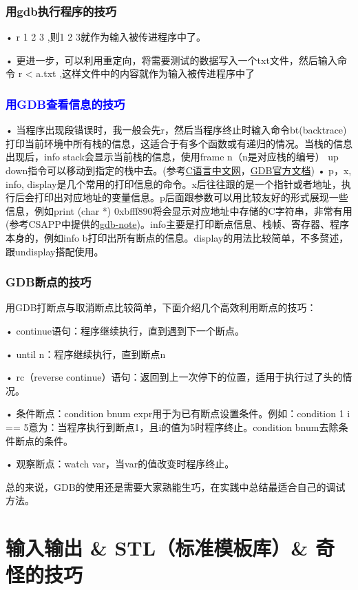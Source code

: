\documentclass[UTF8]{ctexart}
\begin{document}
\subsubsection{用gdb执行程序的技巧}
• r 1 2 3 ,则1 2 3就作为输入被传进程序中了。

• 更进一步，可以利用重定向，将需要测试的数据写入一个txt文件，然后输入命令 r < a.txt ,这样文件中的内容就作为输入被传进程序中了

\subsubsection{\textcolor{blue}{用GDB查看信息的技巧}}
• 当程序出现段错误时，我一般会先r，然后当程序终止时输入命令bt(backtrace)打印当前环境中所有栈的信息，这适合于有多个函数或有递归的情况。当栈的信息出现后，info stack会显示当前栈的信息，使用frame n（n是对应栈的编号） up down指令可以移动到指定的栈中去。(参考\href{https://c.biancheng.net/view/8282.html}{C语言中文网}，\href{https://sourceware.org/gdb/current/onlinedocs/gdb.html/Stack.html#Stack}{GDB官方文档})
• p，x, info, display是几个常用的打印信息的命令。x后往往跟的是一个指针或者地址，执行后会打印出对应地址的变量信息。p后面跟参数可以用比较友好的形式展现一些信息，例如print (char *) 0xbfff890将会显示对应地址中存储的C字符串，非常有用(参考CSAPP中提供的\href{http://www.csapp.cs.cmu.edu/3e/docs/gdbnotes-x86-64.pdf}{gdb-note})。info主要是打印断点信息、栈帧、寄存器、程序本身的，例如info b打印出所有断点的信息。display的用法比较简单，不多赘述，跟undisplay搭配使用。

\subsubsection{GDB断点的技巧}
用GDB打断点与取消断点比较简单，下面介绍几个高效利用断点的技巧：

• continue语句：程序继续执行，直到遇到下一个断点。

• until n：程序继续执行，直到断点n

• rc（reverse continue）语句：返回到上一次停下的位置，适用于执行过了头的情况。

• 条件断点：condition bnum expr用于为已有断点设置条件。例如：condition 1 i == 5意为：当程序执行到断点1，且i的值为5时程序终止。condition bnum去除条件断点的条件。

• 观察断点：watch var，当var的值改变时程序终止。

总的来说，GDB的使用还是需要大家熟能生巧，在实践中总结最适合自己的调试方法。
\section{输入输出 \& STL（标准模板库）\& 奇怪的技巧}
\end{document}
